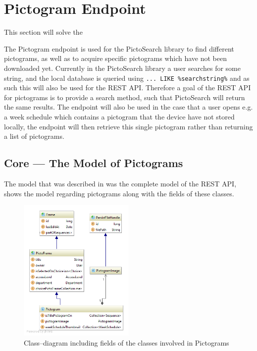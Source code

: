 \section{Pictogram Endpoint}\label{pictogramendpoint}
This section will solve the 

The Pictogram endpoint is used for the PictoSearch library to find different pictograms, as well as to acquire specific pictograms which have not been downloaded yet.
Currently in the PictoSearch library a user searches for some string, and the local database is queried using \texttt{... LIKE \%searchstring\%} and as such this will also be used for the REST API.
Therefore a goal of the REST API for pictograms is to provide a search method, such that PictoSearch will return the same results.
The endpoint will also be used in the case that a user opens e.g. a week schedule which contains a pictogram that the device have not stored locally, the endpoint will then retrieve this single pictogram rather than returning a list of pictograms.

\subsection{Core --- The Model of Pictograms}\label{subsec:pictomodel}
The model that was described in  was the complete model of the REST API,  shows the model regarding pictograms along with the fields of these classes.

\begin{figure}[h]
    \centering
    \includegraphics[width=0.5\textwidth]{figures/diagram-pictogram.png}
    \caption{Class--diagram including fields of the classes involved in Pictograms}\label{fig:pictogramModel}
\end{figure}

